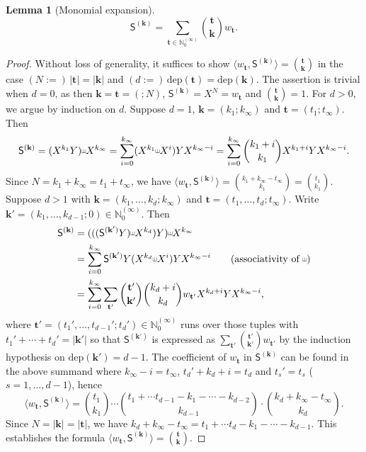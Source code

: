 \documentclass[10pt]{article}
\newtheorem{Lemma}[Theorem]{Lemma}
\theoremstyle{definition}
\theoremstyle{remark}
\def\bk{{\mathbf{k}}}
\def\SS{{\mathsf{S}}}
\def\dep{\mathrm{dep}}
\def\bt{{\mathbf{t}}}
\def\N{{\mathbb N}}
\def\la{\langle}
\def\ra{\rangle}
\def\sha{\scalebox{0.6}[0.8]{\rotatebox[origin=c]{-90}{$\exists$}}}
\begin{document}
\begin{Lemma}[Monomial expansion]
\label{dS-mono}
$$
\SS^{(\bk)}=\sum_{\bt \in\N_0^{(\infty)}}
\binom{\bt}{\bk} w_{\bt}.
$$
\end{Lemma}
\begin{proof}
Without loss of generality, it suffices to show 
$\la w_{\bt}, \SS^{(\bk)} \ra=\binom{\bt}{\bk}$
in the case $(N:=)\,|\bt|=|\bk|$ and $(d:=)\,\dep(\bt)=\dep(\bk)$.
The assertion is trivial when $d=0$, as then
$\bk=\bt=(;N)$, $\SS^{(\bk)}=X^N=w_\bt$ and $\binom{\bt}{\bk}=1$.
For $d>0$, we argue by induction on $d$.
Suppose $d=1$, $\bk=(k_1;k_\infty)$ and $\bt=(t_1;t_\infty)$. Then
$$
\SS^{(\bk)}=
(X^{k_1}Y)\sha X^{k_\infty}
=\sum_{i=0}^{k_\infty}(X^{k_1}\sha X^i)YX^{k_\infty-i}
=\sum_{i=0}^{k_\infty}\binom{k_1+i}{k_1}
X^{k_1+i}YX^{k_\infty-i}.
$$
Since $N=k_1+k_\infty=t_1+t_\infty$, we have
$\la  w_{\bt}, \SS^{(\bk)} \ra=\binom{k_1+k_\infty-t_\infty}{k_1}
=\binom{t_1}{k_1}$.
Suppose $d>1$ with $\bk=(k_1,\dots,k_d;k_\infty)$ and
$\bt=(t_1,\dots,t_d;t_\infty)$.
Write $\bk'=(k_1,\dots,k_{d-1};0)\in \N_0^{(\infty)}
$. Then
\begin{align*}
\SS^{(\bk)}
&=(((\SS^{(\bk')}Y)\sha X^{k_d})Y)\sha X^{k_\infty} 
\\
&=\sum_{i=0}^{k_\infty}
\SS^{(\bk')}
Y(X^{k_d}\sha X^i)YX^{k_\infty-i} 
\qquad (\text{associativity of $\sha$})
\\
&=\sum_{i=0}^{k_\infty}
\sum_{\bt'}\binom{\bt'}{\bk'}
\binom{k_d+i}{k_d}
w_{\bt'}
X^{k_d+i}YX^{k_\infty-i},
\end{align*}
where $\bt'=(t_1',\dots,t_{d-1}';t_d')\in \N_0^{(\infty)}$ runs over
those tuples 
with $t_1'+\cdots+t_d'=|\bk'|$ %
so that $\SS^{(\bk')}$ is expressed as
$\sum_{\bt'}\binom{\bt'}{\bk'}w_{\bt'}$
by the induction hypothesis on $\dep(\bk')=d-1$.
The coefficient of $w_\bt$ in $\SS^{(\bk)}$
can be found in the above summand where
$k_\infty-i=t_\infty$,
$t_d'+k_d+i=t_d$ and
$t_s'=t_s$ ($s=1,\dots,d-1$), hence
$$
\la w_\bt, \SS^{(\bk)} \ra=
\binom{t_1}{k_1}
\cdots
\binom{t_1+\cdots t_{d-1}-k_1-\cdots-k_{d-2}}{k_{d-1}}
\cdot
\binom{k_d+k_\infty-t_\infty}{k_d}.
$$
Since $N=|\bk|=|\bt|$, we have
$k_d+k_\infty-t_\infty
=t_1+\cdots t_{d}-k_1-\cdots-k_{d-1}$.
This establishes the formula  
$\la w_\bt, \SS^{(\bk)} \ra=\binom{\bt}{\bk}$.
\end{proof}
\end{document}
